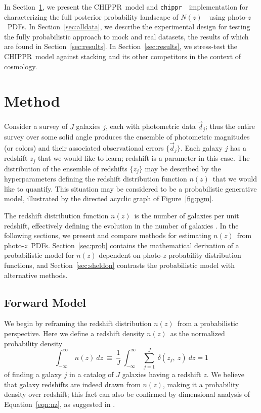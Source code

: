 \documentclass[iop]{emulateapj}
\newcommand{\todo}[3]{{\color{#2}\emph{#1}: #3}}
\newcommand{\aim}[1]{\todo{AIM}{red}{#1}}
\newcommand{\Sect}[1]{Section~\ref{#1}}
\newcommand{\Eq}[1]{Equation~\ref{#1}}
\newcommand{\Fig}[1]{Figure~\ref{#1}}
\newcommand{\project}[1]{{\textsc{#1}}}
\newcommand{\Chippr}{\project{CHIPPR}}
\newcommand{\repo}[1]{{\texttt{#1}}~}
\newcommand{\chippr}{\repo{chippr}}
\newcommand{\nz}{$n(z)$}
\newcommand{\data}{\ensuremath{\vec{d}}}
\newcommand{\pz}{photo-$z$~}
\newcommand{\pzpdf}{\pz PDF}
\newcommand{\Nz}{$N(z)$~}
\begin{document}
In Section~\ref{sec:meth}, we present the \Chippr\ model and \chippr\ implementation for characterizing the full posterior probability landscape of \Nz\ using \pzpdf s. 
In Section~\ref{sec:alldata}, we describe the experimental design for testing the fully probabilistic approach to mock and real datasets, the results of which are found in Section~\ref{sec:results}.
In Section~\ref{sec:results}, we stress-test the \Chippr\ model against stacking and its other competitors in the context of cosmology.

\section{Method}
\label{sec:meth}

Consider a survey of $J$ galaxies $j$, each with photometric data $\data_{j}$; thus the entire survey over some solid angle produces the ensemble of photometric magnitudes (or colors) and their associated observational errors $\{\data_{j}\}$.  
Each galaxy $j$ has a redshift $z_{j}$ that we would like to learn; redshift is a parameter in this case.  
The distribution of the ensemble of redshifts $\{z_{j}\}$ may be described by the hyperparameters defining the redshift distribution function \nz\ that we would like to quantify.  
This situation may be considered to be a probabilistic generative model, illustrated by the directed acyclic graph of \Fig{fig:pgm}.  

The redshift distribution function \nz\ is the number of galaxies per unit redshift, effectively defining the evolution in the number of galaxies \citep{menard_clustering-based_2013}.  
In the following sections, we present and compare methods for estimating \nz\ from \pzpdf s.  
\Sect{sec:prob} contains the mathematical derivation of a probabilistic model for $n(z)$ dependent on photo-$z$ probability distribution functions, and \Sect{sec:sheldon} contrasts the probabilistic model with alternative methods.

\subsection{Forward Model}
\label{sec:forward}

We begin by reframing the redshift distribution \nz\ from a probabilistic perspective.
Here we define a redshift density \nz\ as the normalized probability density
\begin{equation}
\label{eqn:nz}
\int_{-\infty}^{\infty}\ n(z)\ dz\ \equiv\ \frac{1}{J}\ \int_{-\infty}^{\infty}\ \sum_{j=1}^{J}\ \delta(z_{j},\ z)\ dz = 1
\end{equation}
of finding a galaxy $j$ in a catalog of $J$ galaxies having a redshift $z$.
We believe that galaxy redshifts are indeed drawn from \nz, making it a probability density over redshift; this fact can also be confirmed by dimensional analysis of \Eq{eqn:nz}, as suggested in \citet{hogg_data_2012}.
\end{document}
